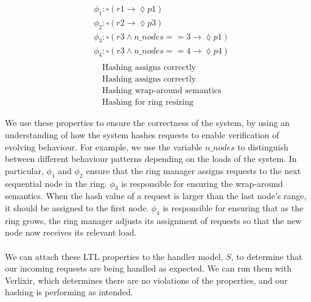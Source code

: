 \begin{multicols}{2}
    \[
        \begin{aligned}
        & \phi_1: \square ( r1 \rightarrow \lozenge p1 ) \\
        & \phi_2: \square ( r2 \rightarrow \lozenge p3 ) \\
        & \phi_3: \square ( r3 \land n\_nodes == 3 \rightarrow \lozenge p1 ) \\
        & \phi_4: \square ( r3 \land n\_nodes == 4 \rightarrow \lozenge p4 ) \\
        \end{aligned}
    \]
    \vline
    \[
    \begin{aligned}
    &\text{Hashing assigns correctly} \\
    &\text{Hashing assigns correctly} \\
    &\text{Hashing wrap-around semantics} \\
    &\text{Hashing for ring resizing}
    \end{aligned}
    \]
\end{multicols}
We use these properties to ensure the correctness of the system, by using an understanding of how the system hashes requests to enable verification of evolving behaviour. For example, we use the variable $n\_nodes$ to distinguish between different behaviour patterns depending on the loads of the system. In particular, $\phi_1$ and $\phi_2$ ensure that the ring manager assigns requests to the next sequential node in the ring. $\phi_3$ is responsible for ensuring the wrap-around semantics. When the hash value of a request is larger than the last node's range, it should be assigned to the first node. $\phi_4$ is responsible for ensuring that as the ring grows, the ring manager adjusts its assignment of requests so that the new node now receives its relevant load.
\\ \\
We can attach these LTL properties to the handler model, $S$, to determine that our incoming requests are being handled as expected. We can run them with Verlixir, which determines there are no violations of the properties, and our hashing is performing as intended.
